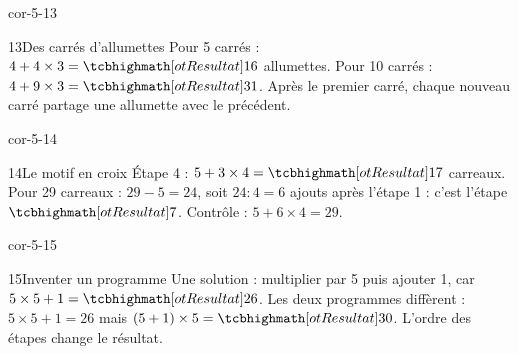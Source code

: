 \begin{blocLivre}{cor-5-13}\begin{corrige}{13}{Des carrés d’allumettes}
Pour 5 carrés : $4+4\times3=\res{16}$ allumettes. Pour 10 carrés : $4+9\times3=\res{31}$. Après le premier carré, chaque nouveau carré partage une allumette avec le précédent.
\label{fig-cor-5-13}
\end{corrige}\end{blocLivre}
\begin{blocLivre}{cor-5-14}\begin{corrige}{14}{Le motif en croix}
Étape 4 : $5+3\times4=\res{17}$ carreaux. Pour 29 carreaux : $29-5=24$, soit $24:4=6$ ajouts après l’étape 1 : c’est l’étape $\res7$. Contrôle : $5+6\times4=29$.
\label{fig-cor-5-14}
\end{corrige}\end{blocLivre}
\begin{blocLivre}{cor-5-15}\begin{corrige}{15}{Inventer un programme}
Une solution : multiplier par 5 puis ajouter 1, car $5\times5+1=\res{26}$. Les deux programmes diffèrent : $5\times5+1=26$ mais $(5+1)\times5=\res{30}$. L’ordre des étapes change le résultat.
\end{corrige}\end{blocLivre}
